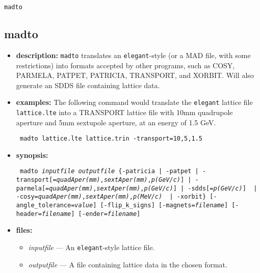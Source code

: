\documentclass[11pt]{article}
\begin{document}
\begin{latexonly}
\newpage
\begin{center}{\Large\verb|madto|}\end{center}
\end{latexonly}
\subsection{madto}
\label{madto}

\begin{itemize}
\item {\bf description:} 
\verb|madto| translates an {\tt elegant}-style (or a MAD file, with
some restrictions) into formats accepted by other programs, such as COSY,
PARMELA, PATPET, PATRICIA, TRANSPORT, and XORBIT.  Will also generate
an SDDS file containing lattice data.

\item {\bf examples:}
The following command would translate the {\tt elegant} lattice file 
\verb|lattice.lte| into a TRANSPORT lattice file with 10mm quadrupole
aperture and 5mm sextupole aperture, at an energy of 1.5 GeV.
\begin{flushleft}{\tt
madto lattice.lte lattice.trin -transport=10,5,1.5
}\end{flushleft}

\item {\bf synopsis:}
\begin{flushleft}{\tt
madto {\em inputfile} {\em outputfile}
 \{-patricia | -patpet | -transport[={\em quadAper(mm)},{\em sextAper(mm)},{\em p(GeV/c)}]
            | -parmela[={\em quadAper(mm)},{\em sextAper(mm)},{\em p(GeV/c)}]
            | -sdds[={\em p(GeV/c)}] \
            | -cosy={\em quadAper(mm)},{\em sextAper(mm)},{\em p(MeV/c)} \
            | -xorbit\}
 [-angle\_tolerance={\em value}] [-flip\_k\_signs] [-magnets={\em filename}]
 [-header={\em filename}] [-ender={\em filename}]
}\end{flushleft}

\item {\bf files:}
\begin{itemize}
\item {\em inputfile} --- An {\tt elegant}-style lattice file.
\item {\em outputfile} --- A file containing lattice data in the chosen format.
\end{itemize}


\end{itemize}
\end{document}
